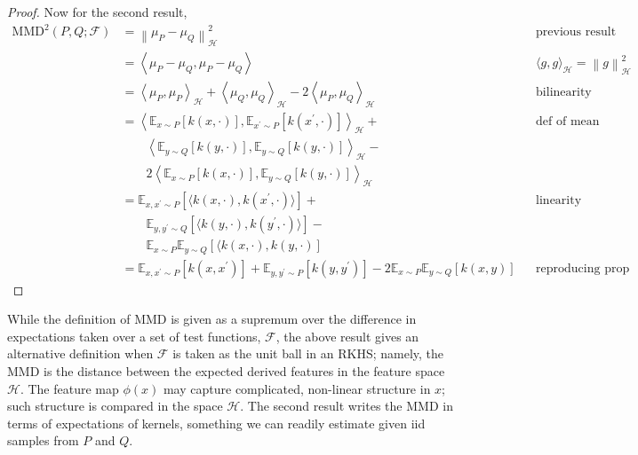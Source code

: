 \documentclass[12pt]{article}
\newcommand*{\norm}[1]{\left\lVert#1\right\rVert}
\newcommand{\E}{\mathbb{E}}
\newcommand{\featureMap}{\phi}
\newcommand{\RKHS}{\mathcal{H}}
\newcommand{\Ker}{k}
\newcommand{\meanEmb}[1]{\mu_{#1}}
\newcommand{\MMD}{\text{MMD}}
\newcommand{\MMDSpace}{\mathcal{F}}
\begin{document}
\begin{proof}
Now for the second result, 
\begin{align*}
\MMD^2(P, Q; \MMDSpace) 
&= \norm{\meanEmb{P} - \meanEmb{Q}}^2_{\RKHS} &&\text{previous result} \\
&= \left\langle \meanEmb{P} - \meanEmb{Q}, \meanEmb{P} - \meanEmb{Q} \right\rangle &&\langle g, g \rangle_{\RKHS} = \norm{g}^2_{\RKHS} \\
&= \left\langle \meanEmb{P}, \meanEmb{P} \right\rangle_{\RKHS} + \left\langle \meanEmb{Q}, \meanEmb{Q} \right\rangle_{\RKHS} - 2 \left\langle \meanEmb{P}, \meanEmb{Q} \right\rangle_{\RKHS} &&\text{bilinearity} \\
&= \left\langle \E_{x \sim P}\left[\Ker(x, \cdot)\right], \E_{x^\prime \sim P}\left[\Ker(x^\prime, \cdot)\right] \right\rangle_{\RKHS} + &&\text{def of mean embedding} \\
	&\qquad \left\langle \E_{y \sim Q}\left[\Ker(y, \cdot)\right], \E_{y \sim Q}\left[\Ker(y, \cdot)\right] \right\rangle_{\RKHS} - \\
	&\qquad 2 \left\langle \E_{x \sim P}\left[\Ker(x, \cdot)\right], \E_{y \sim Q}\left[\Ker(y, \cdot)\right] \right\rangle_{\RKHS} \\
&= \E_{x, x^\prime \sim P} \left[\langle \Ker(x, \cdot), \Ker(x^\prime, \cdot)\rangle \right] + &&\text{linearity} \\
	&\qquad \E_{y, y^\prime \sim Q} \left[\langle \Ker(y, \cdot), \Ker(y^\prime, \cdot)\rangle \right] - \\
	&\qquad \E_{x \sim P} \E_{y \sim Q} \left[\langle \Ker(x, \cdot), \Ker(y, \cdot) \right] \\
&= \E_{x, x^\prime \sim P}\left[\Ker(x, x^\prime) \right] + \E_{y, y^\prime \sim P}\left[\Ker(y, y^\prime) \right] - 2 \E_{x \sim P} \E_{y \sim Q}\left[\Ker(x, y)\right] &&\text{reproducing prop}
\end{align*}
\end{proof}

While the definition of MMD is given as a supremum over the difference in expectations taken over a set of test functions, $\MMDSpace$, the above result gives an alternative definition 
when $\MMDSpace$ is taken as the unit ball in an RKHS; namely, the MMD is the distance between the expected derived features in the feature space $\RKHS$. The feature map 
$\featureMap(x)$ may capture complicated, non-linear structure in $x$; such structure is compared in the space $\RKHS$. The second result writes the MMD in terms of expectations 
of kernels, something we can readily estimate given iid samples from $P$ and $Q$. 
\end{document}
